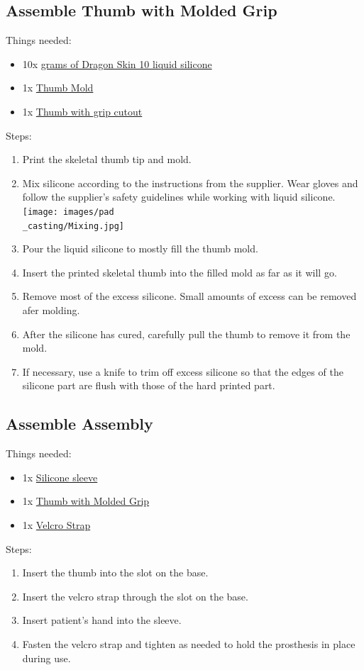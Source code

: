 \documentclass[11pt]{article}
\begin{document}
\subsection{Assemble Thumb with Molded Grip}
Things needed:
\begin{itemize}
\item 10x \hyperlink{thing_g\_dragon\_skin\_10}{grams of Dragon Skin 10 liquid silicone}
\item 1x \hyperlink{thing_thumb\_mold}{Thumb Mold}
\item 1x \hyperlink{thing_thumb\_with\_grip\_cutout}{Thumb with grip cutout}
\end{itemize}
Steps:
\begin{enumerate}
\item Print the skeletal thumb tip and mold.
\item Mix silicone according to the instructions from the supplier. Wear gloves and follow the supplier's safety guidelines while working with liquid silicone.\\ \texttt{[image: images/pad\\\_casting/Mixing.jpg]}
\item Pour the liquid silicone to mostly fill the thumb mold.
\item Insert the printed skeletal thumb into the filled mold as far as it will go.
\item Remove most of the excess silicone. Small amounts of excess can be removed afer molding.
\item After the silicone has cured, carefully pull the thumb to remove it from the mold.
\item If necessary, use a knife to trim off excess silicone so that the edges of the silicone part are flush with those of the hard printed part.
\end{enumerate}

\subsection{Assemble Assembly}
Things needed:
\begin{itemize}
\item 1x \hyperlink{thing_silicone\_sleeve}{Silicone sleeve}
\item 1x \hyperlink{thing_molded\_thumb}{Thumb with Molded Grip}
\item 1x \hyperlink{thing_velcro\_strap}{Velcro Strap}
\end{itemize}
Steps:
\begin{enumerate}
\item Insert the thumb into the slot on the base.
\item Insert the velcro strap through the slot on the base.
\item Insert patient's hand into the sleeve.
\item Fasten the velcro strap and tighten as needed to hold the prosthesis in place during use.
\end{enumerate}

\newpage
\end{document}
